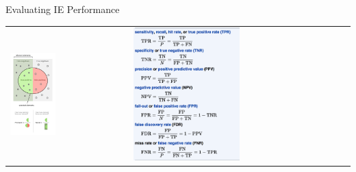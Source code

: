 \documentclass[10pt]{beamer}
\begin{document}
\begin{frame}{Evaluating IE Performance}
\begin{tabular}{p{5cm} p{7cm}}
    \vspace{0pt}
    \includegraphics[width=0.4\textwidth]{figures/precisionrecall.png}
    &
    \vspace{0pt}
    \includegraphics[width=0.5\textwidth]{figures/precisionrecall-formulas.png}
\end{tabular}
\end{frame}
\end{document}
